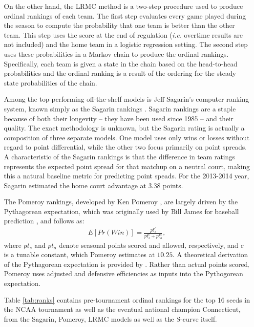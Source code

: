 \documentclass[letterpaper,12pt]{article}
\begin{document}
On the other hand, the LRMC method \citep{Kvam2006, mark2010} is a two-step procedure used to produce ordinal rankings of each team. The first step evaluates every game played during the season to compute the probability that one team is better than the other team. This step uses the score at the end of regulation (\emph{i.e.} overtime results are not included) and the home team in a logistic regression setting. The second step uses these probabilities in a Markov chain to produce the ordinal rankings. Specifically, each team is given a state in the chain based on the head-to-head probabilities and the ordinal ranking is a result of the ordering for the steady state probabilities of the chain.

Among the top performing off-the-shelf models is Jeff Sagarin's computer ranking system, known simply as the Sagarin rankings \citep{sagarin}. Sagarin rankings are a staple because of both their longevity -- they have been used since 1985 -- and their quality. The exact methodology is unknown, but the Sagarin rating is actually a composition of three separate models. One model uses only wins or losses without regard to point differential, while the other two focus primarily on point spreads. A characteristic of the Sagarin rankings is that the difference in team ratings represents the expected point spread for that matchup on a neutral court, making this a natural baseline metric for predicting point speads. For the 2013-2014 year, Sagarin estimated the home court advantage at 3.38 points.

The Pomeroy rankings, developed by Ken Pomeroy \citep{kenpom.com}, are largely driven by the Pythagorean expectation, which was originally used by Bill James for baseball prediction \citep{james}, and follows as:
\begin{eqnarray}
E[Pr(Win)] = \frac{pt_s^c}{pt_s^c + pt_a^c},
\end{eqnarray}
where $pt_s$ and $pt_a$ denote seasonal points scored and allowed, respectively, and $c$ is a tunable constant, which Pomeroy estimates at $10.25$.  
A theoretical derivation of the Pythagorean expectation is provided by \cite{miller2007}.
Rather than actual points scored, Pomeroy uses adjusted and defensive efficiencies as inputs into the Pythogorean expectation.

Table \ref{tab:ranks} contains pre-tournament ordinal rankings for the top 16 seeds in the NCAA tournament as well as the eventual national champion Connecticut, from the Sagarin, Pomeroy, LRMC models as well as the S-curve itself.
\end{document}

